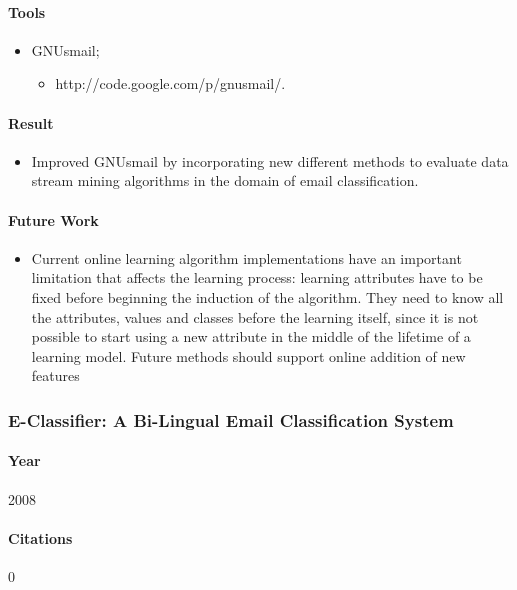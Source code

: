 \documentclass[12pt]{article}
\begin{document}
\paragraph{Tools}
\begin{itemize}
    \item GNUsmail;
    \begin{itemize}
        \item http://code.google.com/p/gnusmail/.
    \end{itemize}
\end{itemize}

\paragraph{Result}
\begin{itemize}
\item Improved GNUsmail by incorporating new different methods to evaluate data stream mining algorithms in the domain of email classification.
\end{itemize}

\paragraph{Future Work}
\begin{itemize}
\item Current online learning algorithm implementations have an important limitation that affects the learning process: learning attributes have to be fixed before beginning the induction of the algorithm. They need to know all the attributes, values and classes before the learning itself, since it is not possible to start using a new attribute in the middle of the lifetime of a learning model. Future methods should support online addition of new features
\end{itemize}


\subsubsection{E-Classifier: A Bi-Lingual Email Classification System}
\paragraph{Year} 2008
\paragraph{Citations} 0
\end{document}
